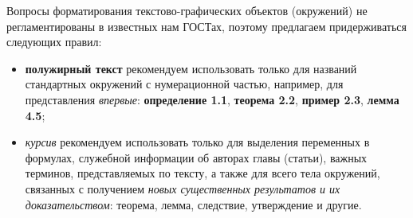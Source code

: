 Вопросы форматирования текстово-графических объектов (окружений) не регламентированы в известных нам ГОСТах, поэтому предлагаем придерживаться следующих правил:

\begin{itemize}
	\item \textbf{полужирный текст} рекомендуем использовать только для названий стандартных окружений с нумерационной частью, например, для представления \textit{впервые}: \textbf{определение 1.1}, \textbf{теорема 2.2}, \textbf{пример 2.3}, \textbf{лемма 4.5};

	\item \textit{курсив} рекомендуем использовать только для выделения переменных в формулах, служебной информации об авторах главы (статьи), важных терминов, представляемых по тексту, а также для всего тела окружений, связанных с получением \textit{новых существенных результатов и их доказательством}: теорема, лемма, следствие, утверждение и другие.
\end{itemize}


